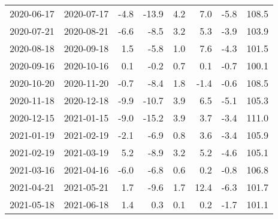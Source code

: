 \begin{tabular}{llrrrrrr}
 2020-06-17 & 2020-07-17 &     -4.8 &      -13.9 &        4.2 &       7.0 &      -5.8 &       108.5 \\
 2020-07-21 & 2020-08-21 &     -6.6 &       -8.5 &        3.2 &       5.3 &      -3.9 &       103.9 \\
 2020-08-18 & 2020-09-18 &      1.5 &       -5.8 &        1.0 &       7.6 &      -4.3 &       101.5 \\
 2020-09-16 & 2020-10-16 &      0.1 &       -0.2 &        0.7 &       0.1 &      -0.7 &       100.1 \\
 2020-10-20 & 2020-11-20 &     -0.7 &       -8.4 &        1.8 &      -1.4 &      -0.6 &       108.5 \\
 2020-11-18 & 2020-12-18 &     -9.9 &      -10.7 &        3.9 &       6.5 &      -5.1 &       105.3 \\
 2020-12-15 & 2021-01-15 &     -9.0 &      -15.2 &        3.9 &       3.7 &      -3.4 &       111.0 \\
 2021-01-19 & 2021-02-19 &     -2.1 &       -6.9 &        0.8 &       3.6 &      -3.4 &       105.9 \\
 2021-02-19 & 2021-03-19 &      5.2 &       -8.9 &        3.2 &       5.2 &      -4.6 &       105.1 \\
 2021-03-16 & 2021-04-16 &     -6.0 &       -6.8 &        0.6 &       0.2 &      -0.8 &       106.8 \\
 2021-04-21 & 2021-05-21 &      1.7 &       -9.6 &        1.7 &      12.4 &      -6.3 &       101.7 \\
 2021-05-18 & 2021-06-18 &      1.4 &        0.3 &        0.1 &       0.2 &      -1.7 &       101.1 \\
\hline
\end{tabular}